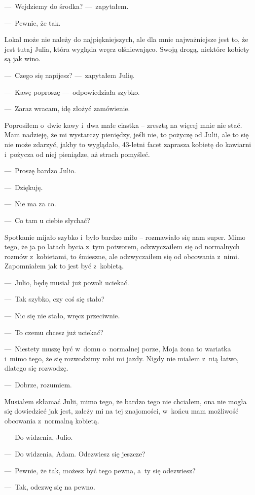 ---~Wejdziemy do środka? ---~zapytałem.

---~Pewnie, że tak.

Lokal może nie należy do najpiękniejszych, ale dla mnie najważniejsze jest to, że jest tutaj Julia, która wygląda 
wręcz olśniewająco. Swoją drogą, niektóre kobiety są jak wino.

---~Czego się napijesz? ---~zapytałem Julię.

---~Kawę poproszę ---~odpowiedziała szybko.

---~Zaraz wracam, idę złożyć zamówienie.

Poprosiłem o~dwie kawy i~dwa małe ciastka -- zresztą na więcej mnie nie stać. Mam nadzieję, że mi wystarczy 
pieniędzy, jeśli nie, to pożyczę od Julii, ale to się nie może zdarzyć, jakby to wyglądało, 43-letni facet zaprasza 
kobietę do kawiarni i~pożycza od niej pieniądze, aż strach pomyśleć.

---~Proszę bardzo Julio.

---~Dziękuję.

---~Nie ma za co.

---~Co tam u ciebie słychać?

Spotkanie mijało szybko i~było bardzo miło -- rozmawiało się nam super. Mimo tego, że ja po latach bycia z~tym 
potworem, odzwyczaiłem się od normalnych rozmów z~kobietami, to śmieszne, ale odzwyczaiłem się od obcowania z~nimi. 
Zapomniałem jak to jest być z~kobietą.

---~Julio, będę musiał już powoli uciekać.

---~Tak szybko, czy coś się stało?

---~Nic się nie stało, wręcz przeciwnie.

---~To czemu chcesz już uciekać?

---~Niestety muszę być w~domu o~normalnej porze, Moja żona to wariatka i~mimo tego, że się rozwodzimy robi mi jazdy. 
Nigdy nie miałem z~nią łatwo, dlatego się rozwodzę.

---~Dobrze, rozumiem.

Musiałem skłamać Julii, mimo tego, że bardzo tego nie chciałem, ona nie mogła się dowiedzieć jak jest, zależy mi na 
tej znajomości, w~końcu mam możliwość obcowania z~normalną kobietą.

---~Do widzenia, Julio.

---~Do widzenia, Adam. Odezwiesz się jeszcze?

---~Pewnie, że tak, możesz być tego pewna, a~ty się odezwiesz?

---~Tak, odezwę się na pewno.

